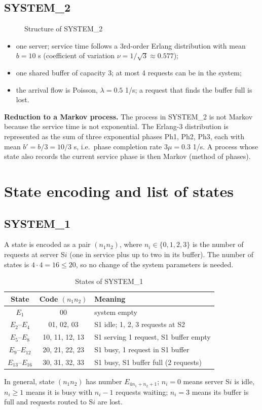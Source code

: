 \documentclass[12pt,a4paper]{article}
\begin{document}
\subsection{SYSTEM\_2}
\begin{figure}[H]\centering\schemeTwo\caption{Structure of SYSTEM\_2}\end{figure}
\begin{itemize}
\item one server; service time follows a 3rd-order Erlang distribution with mean $b = 10$ s (coefficient of variation $\nu = 1/\sqrt{3} \approx 0.577$);
\item one shared buffer of capacity 3; at most 4 requests can be in the system;
\item the arrival flow is Poisson, $\lambda = 0.5$ 1/s; a request that finds the buffer full is lost.
\end{itemize}

\textbf{Reduction to a Markov process.} The process in SYSTEM\_2 is not Markov because the service time
is not exponential. The Erlang-3 distribution is represented as the sum of three exponential phases
Ph1, Ph2, Ph3, each with mean $b' = b/3 = 10/3$ s, i.e.\ phase completion rate $3\mu = 0.3$ 1/s.
A process whose state also records the current service phase is then Markov (method of phases).

\section{State encoding and list of states}
\subsection{SYSTEM\_1}
A state is encoded as a pair $(n_1 n_2)$, where $n_i \in \{0,1,2,3\}$ is the number of requests at
server S$i$ (one in service plus up to two in its buffer). The number of states is $4\cdot 4 = 16 \le 20$,
so no change of the system parameters is needed.

\begin{table}[H]
\centering\small
\caption{States of SYSTEM\_1}
\begin{tabular}{cc l}
\toprule
State & Code $(n_1 n_2)$ & Meaning \\
\midrule
$E_1$ & 00 & system empty \\
$E_2$–$E_4$ & 01, 02, 03 & S1 idle; 1, 2, 3 requests at S2 \\
$E_5$–$E_8$ & 10, 11, 12, 13 & S1 serving 1 request, S1 buffer empty \\
$E_9$–$E_{12}$ & 20, 21, 22, 23 & S1 busy, 1 request in S1 buffer \\
$E_{13}$–$E_{16}$ & 30, 31, 32, 33 & S1 busy, S1 buffer full (2 requests) \\
\bottomrule
\end{tabular}
\end{table}
In general, state $(n_1 n_2)$ has number $E_{4n_1+n_2+1}$; $n_i=0$ means server S$i$ is idle,
$n_i\ge1$ means it is busy with $n_i-1$ requests waiting; $n_i=3$ means its buffer is full and
requests routed to S$i$ are lost.
\end{document}
